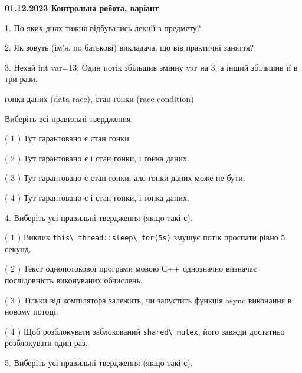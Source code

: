 \documentclass[12pt, ukrainian]{article}
\def\code#1{\Verb!#1!}
\begin{document}
\vspace{4mm}
\newpage
\begin {large}

\textbf{01.12.2023 Контрольна робота, варіант  }\par


{
1. По яких днях тижня відбувались лекції з предмету?



\vspace{5mm}
2. Як зовуть (ім'я, по батькові) викладача, що вів практичні заняття?



\vspace{5mm}
3. Нехай int var=13; Один потік збільшив змінну var на 3, а інший збільшив її в три рази.

гонка даних (data race), стан гонки (race condition)

Виберіть всі правильні твердження.\par
\vspace{2mm}
( 1 ) Тут гарантовано є стан гонки.%

( 2 ) Тут гарантовано є і стан гонки, і гонка даних.%

( 3 ) Тут гарантовано є стан гонки, але гонки даних може не бути.%

( 4 ) Тут гарантовано є і стан гонки, і гонка даних.%


\vspace{5mm}
4. Виберіть усі правильні твердження (якщо такі є).\par
\vspace{2mm}

( 1 ) Виклик \code{this\_thread::sleep\_for(5s)} змушує потік проспати рівно 5 секунд.%

( 2 ) Текст однопотокової програми мовою С++ однозначно визначає послідовність виконуваних обчислень.%

( 3 ) Тільки від компілятора залежить, чи запустить функція async виконання в новому потоці.%

( 4 ) Щоб розблокувати заблокований \code{shared\_mutex}, його завжди достатньо розблокувати один раз.%


\vspace{5mm}
5. Виберіть усі правильні твердження (якщо такі є).\par
\vspace{2mm}

}
\end{large}
\end{document}
